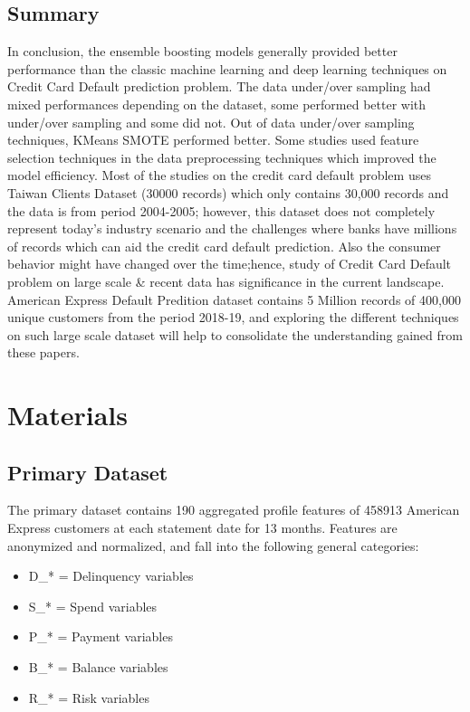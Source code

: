 \documentclass[twoside,11pt,a4paper]{article}
\begin{document}
\subsection{Summary}
In conclusion, the ensemble boosting models generally provided better performance than the classic machine learning and deep learning techniques on Credit Card Default prediction problem. The data under/over sampling had mixed performances depending on the dataset, some performed better with under/over sampling and some did not. Out of data under/over sampling techniques, KMeans \acs{SMOTE} performed better. Some studies used feature selection techniques in the data preprocessing techniques which improved the model efficiency. Most of the studies on the credit card default problem uses Taiwan Clients Dataset (30000 records) \citep{yeh2009comparisons} which only contains 30,000 records and the data is from period 2004-2005; however, this dataset does not completely represent today's industry scenario and the challenges where banks have millions of records which can aid the credit card default prediction. Also the consumer behavior might have changed over the time;hence, study of Credit Card Default problem on large scale \& recent data has significance in the current landscape. American Express Default Predition  dataset \citep{amex-default-prediction-dataset} contains 5 Million records of 400,000 unique customers from the period 2018-19, and exploring the different techniques on such large scale dataset will help to consolidate the understanding gained from these papers.

\vfill
\clearpage
\section{Materials}\label{sec:materials}

\subsection{Primary Dataset}
The primary dataset contains 190 aggregated profile features of 458913 American Express customers at each statement date for 13 months. Features are anonymized and normalized, and fall into the following general categories:

\begin{itemize}
	\item D\_* = Delinquency variables
	\item S\_* = Spend variables
	\item P\_* = Payment variables
	\item B\_* = Balance variables
	\item R\_* = Risk variables	
\end{itemize}
\end{document}
